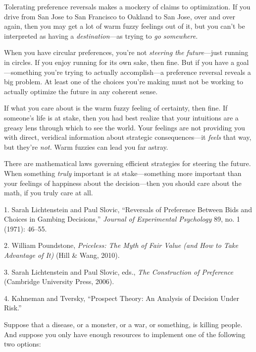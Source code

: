 {
 Tolerating preference reversals makes a mockery of claims to
optimization. If you drive from San Jose to San Francisco to Oakland to
San Jose, over and over again, then you may get a lot of warm fuzzy
feelings out of it, but you can't be interpreted as
having a \textit{destination}{}---as trying to \textit{go somewhere}.}

{
 When you have circular preferences, you're not
\textit{steering the future}{}---just running in circles. If you enjoy
running for its own sake, then fine. But if you have a goal---something
you're trying to actually accomplish---a preference
reversal reveals a big problem. At least one of the choices
you're making must not be working to actually optimize
the future in any coherent sense.}

{
 If what you care about is the warm fuzzy feeling of certainty,
then fine. If someone's life is at stake, then you had
best realize that your intuitions are a greasy lens through which to
see the world. Your feelings are not providing you with direct,
veridical information about strategic consequences---it \textit{feels}
that way, but they're \textit{not.} Warm fuzzies can
lead you far astray.}

{
 There are mathematical laws governing efficient strategies for
steering the future. When something \textit{truly} important is at
stake---something more important than your feelings of happiness about
the decision---then you should care about the math, if you truly care
at all.}

\myendsectiontext


\bigskip

{
 1. Sarah Lichtenstein and Paul Slovic,
``Reversals of Preference Between Bids and Choices in
Gambing Decisions,'' \textit{Journal of Experimental
Psychology} 89, no. 1 (1971): 46--55.}

{
 2. William Poundstone, \textit{Priceless: The Myth of Fair Value
(and How to Take Advantage of It)} (Hill \& Wang, 2010).}

{
 3. Sarah Lichtenstein and Paul Slovic, eds., \textit{The
Construction of Preference} (Cambridge University Press, 2006).}

{
 4. Kahneman and Tversky, ``Prospect Theory: An
Analysis of Decision Under Risk.''}


{
 Suppose that a disease, or a monster, or a war, or something, is
killing people. And suppose you only have enough resources to implement
one of the following two options:}

